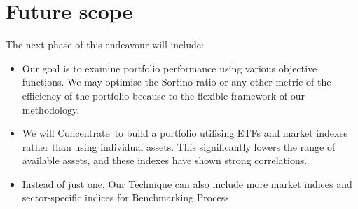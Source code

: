 \section{Future scope}
The next phase of this endeavour will include:
\begin{itemize}

\item Our goal is to examine portfolio performance using various objective functions. We may optimise the Sortino ratio or any other metric of the efficiency of the portfolio because to the flexible framework of our methodology.

\item We will Concentrate to build a portfolio utilising ETFs and market indexes rather than using individual assets. This significantly lowers the range of available assets, and these indexes have shown strong correlations.

\item Instead of just one, Our Technique can also include more market indices and sector-specific indices for Benchmarking Process
\end{itemize}
